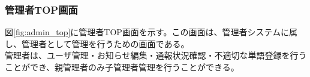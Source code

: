 \documentclass[a4j]{jarticle}
\begin{document}


\subsubsection{管理者TOP画面}
図\ref{fig:admin_top}に管理者TOP画面を示す。この画面は、管理者システムに属し、管理者として管理を行うための画面である。\\
管理者は、ユーザ管理・お知らせ編集・通報状況確認・不適切な単語登録を行うことができ、親管理者のみ子管理者管理を行うことができる。
\end{document}
